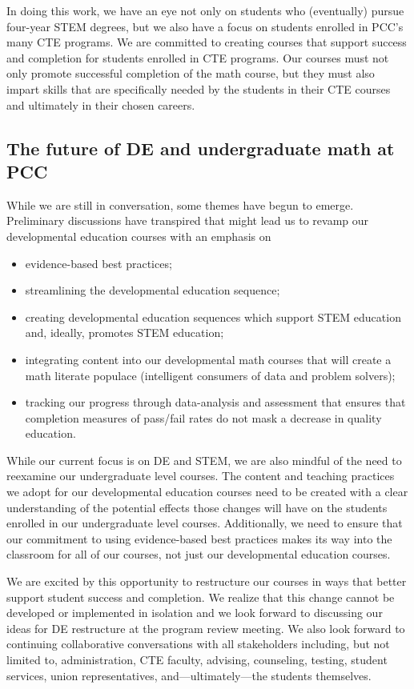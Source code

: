 In doing this work, we have an eye not only on students who (eventually)
pursue four-year STEM degrees, but we also have a focus on students enrolled in
PCC's many CTE programs.  We are committed to creating courses that support
success and completion for students enrolled in CTE programs.  Our courses must
not only promote successful completion of the math course, but they must also
impart skills that are specifically needed by the students in their CTE
courses and ultimately in their chosen careers.

\subsection{The future of DE and undergraduate math at PCC}\label{over:sec:DEfuture}
While we are still in conversation, some themes have begun to emerge.
Preliminary discussions have transpired that might lead us to
revamp our developmental education courses with an emphasis on 
\begin{itemize}
\item evidence-based best practices;
\item streamlining the developmental education sequence;
\item creating developmental education sequences which support STEM education and,
ideally, promotes STEM education; 
\item integrating content into our developmental math
courses that will create a math literate populace (intelligent consumers of data
and problem solvers);
\item tracking our progress through data-analysis and assessment that ensures that
completion measures of  pass/fail rates do not mask a decrease in quality
education.
\end{itemize}

While our current focus is on DE and STEM, we are also mindful of the need to
reexamine our undergraduate level courses. The content and teaching practices we
adopt for our developmental  education courses need to be created with a clear
understanding of the potential effects those changes will have on the students
enrolled in our undergraduate level courses. Additionally, we need to ensure
that our commitment to using evidence-based best practices makes its way into
the classroom for all of our courses, not just our developmental education
courses.

We are excited by this opportunity to restructure our courses in ways that
better support student success and completion. We realize that this change
cannot be developed or implemented in isolation and we look forward to
discussing our ideas for DE restructure at the program review meeting. We also look
forward to continuing collaborative conversations with all
stakeholders including, but not limited to, administration, CTE faculty,
advising, counseling, testing, student services, union representatives, and---ultimately---the students themselves.


